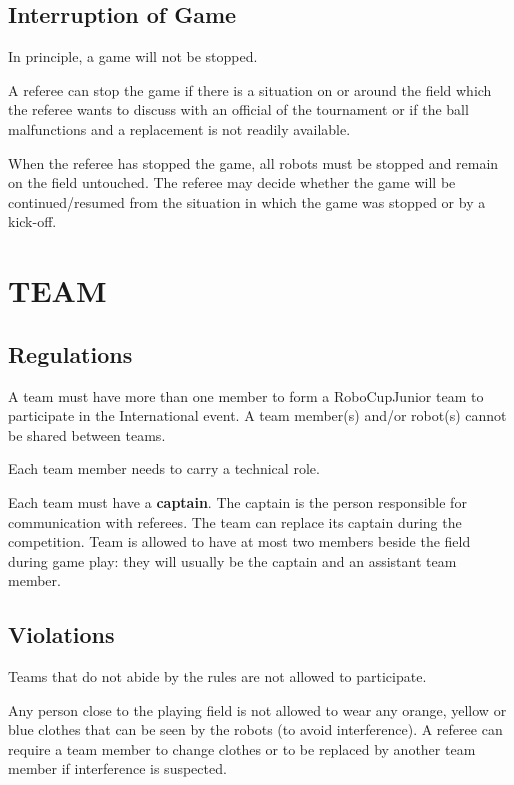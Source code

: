 \documentclass{article}
\begin{document}
\subsection{Interruption of Game \label{ref-interruption}}

In principle, a game will not be stopped.

A referee can stop the game if there is a situation on or around the field
which the referee wants to discuss with an official of the tournament or if the
ball malfunctions and a replacement is not readily available.

When the referee has stopped the game, all robots must be stopped and remain on
the field untouched. The referee may decide whether the game will be
continued/resumed from the situation in which the game was stopped or by a
kick-off.

\section{TEAM \label{ref-015}}

\subsection{Regulations \label{ref-team-regulations}}

A team must have more than one member to form a RoboCupJunior team to
participate in the International event. A team member(s) and/or robot(s) cannot
be shared between teams.

Each team member needs to carry a technical role.

Each team must have a \textbf{captain}. The captain is the person responsible
for communication with referees. The team can replace its captain during the
competition. Team is allowed to have at most two members beside the field
during game play: they will usually be the captain and an assistant team
member.

\subsection{Violations \label{ref-violations}}

Teams that do not abide by the rules are not allowed to participate.

Any person close to the playing field is not allowed to wear any orange, yellow
or blue clothes that can be seen by the robots (to avoid interference). A
referee can require a team member to change clothes or to be replaced by
another team member if interference is suspected.
\end{document}
